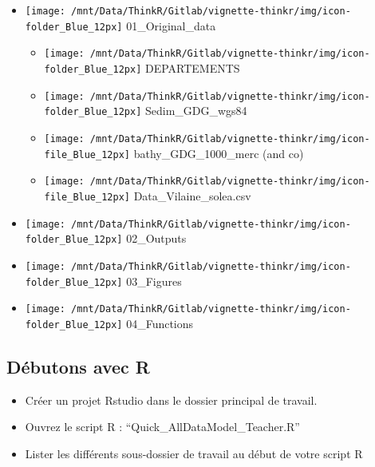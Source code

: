 \documentclass[french,a4paper]{article}
\providecommand{\tightlist}{%
  \setlength{\itemsep}{0pt}\setlength{\parskip}{0pt}}
\begin{document}
\begin{itemize}
\tightlist
\item
  \texttt{[image: /mnt/Data/ThinkR/Gitlab/vignette-thinkr/img/icon-folder\_Blue\_12px]}
  01\_Original\_data

  \begin{itemize}
  \tightlist
  \item
    \texttt{[image: /mnt/Data/ThinkR/Gitlab/vignette-thinkr/img/icon-folder\_Blue\_12px]}
    DEPARTEMENTS
  \item
    \texttt{[image: /mnt/Data/ThinkR/Gitlab/vignette-thinkr/img/icon-folder\_Blue\_12px]}
    Sedim\_GDG\_wgs84
  \item
    \texttt{[image: /mnt/Data/ThinkR/Gitlab/vignette-thinkr/img/icon-file\_Blue\_12px]}
    bathy\_GDG\_1000\_merc (and co)
  \item
    \texttt{[image: /mnt/Data/ThinkR/Gitlab/vignette-thinkr/img/icon-file\_Blue\_12px]}
    Data\_Vilaine\_solea.csv
  \end{itemize}
\item
  \texttt{[image: /mnt/Data/ThinkR/Gitlab/vignette-thinkr/img/icon-folder\_Blue\_12px]}
  02\_Outputs
\item
  \texttt{[image: /mnt/Data/ThinkR/Gitlab/vignette-thinkr/img/icon-folder\_Blue\_12px]}
  03\_Figures
\item
  \texttt{[image: /mnt/Data/ThinkR/Gitlab/vignette-thinkr/img/icon-folder\_Blue\_12px]}
  04\_Functions
\end{itemize}

\subsection{Débutons avec R}\label{debutons-avec-r}

\begin{itemize}
\tightlist
\item
  Créer un projet Rstudio dans le dossier principal de travail.
\item
  Ouvrez le script R : ``Quick\_AllDataModel\_Teacher.R''
\item
  Lister les différents sous-dossier de travail au début de votre script
  R
\end{itemize}
\end{document}
